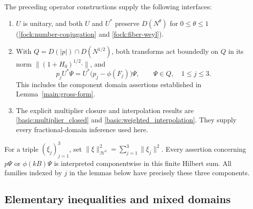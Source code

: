 \documentclass[11pt,a4paper]{article}
\theoremstyle{definition}
\theoremstyle{remark}
\begin{document}
The preceding operator constructions supply the following interfaces:
\begin{enumerate}
\item \(U\) is unitary, and both \(U\) and \(U^*\) preserve
      \(D(N^\theta)\) for \(0\leq\theta\leq1\)
      (\ref{fock:number-conjugation} and \ref{fock:fiber-weyl}).
\item With \(Q=D(|p|)\cap D(N^{1/2})\), both transforms act boundedly on
      \(Q\) in its norm \(\|(1+H_0)^{1/2}\cdot\|\), and
      \begin{equation}
       p_jU^*\Psi=U^*\bigl(p_j-\phi(F_j)\bigr)\Psi,
       \qquad \Psi\in Q,\quad 1\leq j\leq3.
       \label{reg:momentum-interface}
      \end{equation}
      This includes the component domain assertions established in
      Lemma~\ref{main:gross-form}.
\item The explicit multiplier closure and interpolation results are
      \ref{basic:multiplier_closed} and \ref{basic:weighted_interpolation}.
      They supply every fractional-domain inference used here.
\end{enumerate}

For a triple \((\xi_j)_{j=1}^3\), set
\(\|\xi\|_{\mathcal H^3}^2=\sum_{j=1}^3\|\xi_j\|^2\).
Every assertion concerning \(p\Psi\) or \(\phi(kB)\Psi\) is interpreted
componentwise in this finite Hilbert sum. All families indexed by \(j\)
in the lemmas below have precisely these three components.

\subsection{Elementary inequalities and mixed domains}
\end{document}

